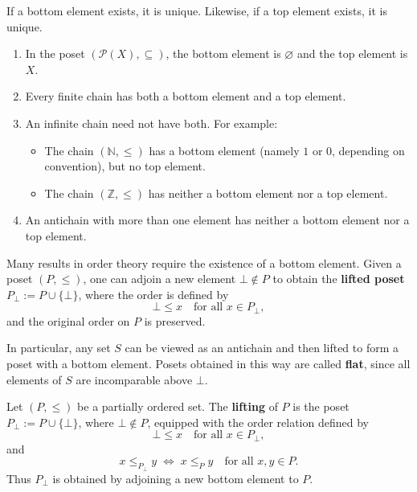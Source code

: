 \begin{remark}[Uniqueness]
If a bottom element exists, it is unique. Likewise, if a top element exists, it is unique.
\end{remark}

\begin{example}
\begin{enumerate}
    \item In the poset $(\mathcal{P}(X), \subseteq)$, the bottom element is $\varnothing$ and the top element is $X$.

    \item Every finite chain has both a bottom element and a top element.

    \item An infinite chain need not have both. For example:
    \begin{itemize}
        \item The chain $(\mathbb{N}, \le)$ has a bottom element (namely $1$ or $0$, depending on convention), but no top element.
        \item The chain $(\mathbb{Z}, \le)$ has neither a bottom element nor a top element.
    \end{itemize}

    \item An antichain with more than one element has neither a bottom element nor a top element.
\end{enumerate}
\end{example}


\begin{remark}[Lifting]
Many results in order theory require the existence of a bottom element. Given a poset $(P,\le)$, one can adjoin a new element $\bot \notin P$ to obtain the \textbf{lifted poset} $P_\bot := P \cup \{\bot\}$, where the order is defined by
\[
\bot \le x \quad \text{for all } x \in P_\bot,
\]
and the original order on $P$ is preserved.

In particular, any set $S$ can be viewed as an antichain and then lifted to form a poset with a bottom element. Posets obtained in this way are called \textbf{flat}, since all elements of $S$ are incomparable above $\bot$.
\end{remark}



\begin{definition}[Lifting]
Let $(P,\le)$ be a partially ordered set. The \textbf{lifting} of $P$ is the poset $P_{\bot} := P \cup \{\bot\}$, where $\bot \notin P$, equipped with the order relation defined by
\[
\bot \le x \quad \text{for all } x \in P_{\bot},
\]
and
\[
x \le_{P_{\bot}} y \;\Longleftrightarrow\; x \le_P y \quad \text{for all } x,y \in P.
\]
Thus $P_{\bot}$ is obtained by adjoining a new bottom element to $P$.
\end{definition}

